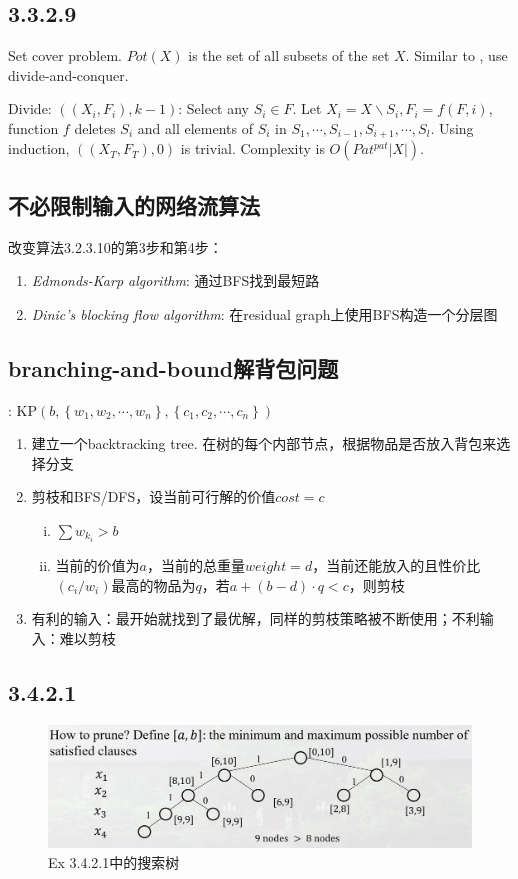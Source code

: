 \documentclass{article}
\begin{document}
	\subsection*{3.3.2.9}
	Set cover problem. $Pot(X)$ is the set of all subsets of the set $X$. Similar to , use divide-and-conquer.\par 
	Divide: $((X_i,F_i),k-1)$: Select any $S_i\in F$. Let $X_i=X\backslash S_i,F_i=f(F,i)$, function $f$ deletes $S_i$ and all elements of $S_i$ in $S_1,\cdots,S_{i-1},S_{i+1},\cdots, S_l$. Using induction, $((X_T,F_T),0)$ is trivial. Complexity is $O(Pat^{pat}|X|)$.
	\subsection*{不必限制输入的网络流算法}
	改变算法3.2.3.10的第3步和第4步：
	\begin{enumerate}[1.]
		\item \emph{Edmonds-Karp algorithm}: 通过BFS找到最短路
		\item \emph{Dinic's blocking flow algorithm}: 在residual graph上使用BFS构造一个分层图
	\end{enumerate}
	\subsection*{branching-and-bound解背包问题}
	: KP$\left(b,\left\{w_1,w_2,\cdots,w_n\right\},\left\{c_1,c_2,\cdots,c_n\right\}\right)$
	\begin{enumerate}[(1)]
		\item 建立一个backtracking tree. 在树的每个内部节点，根据物品是否放入背包来选择分支
		\item 剪枝和BFS/DFS，设当前可行解的价值$cost=c$
		\begin{enumerate}[i.]
			\item $\sum w_{k_i}>b$
			\item 当前的价值为$a$，当前的总重量$weight=d$，当前还能放入的且性价比$(c_i/w_i)$最高的物品为$q$，若$a+(b-d)\cdot q<c$，则剪枝
		\end{enumerate}
		\item 有利的输入：最开始就找到了最优解，同样的剪枝策略被不断使用；不利输入：难以剪枝 
	\end{enumerate}
	\subsection*{3.4.2.1}
	\begin{figure}[H]
		\centering
		\includegraphics[width=1\linewidth]{hw4-2.png}
		\caption{Ex 3.4.2.1中的搜索树}
	\end{figure}
\end{document}
